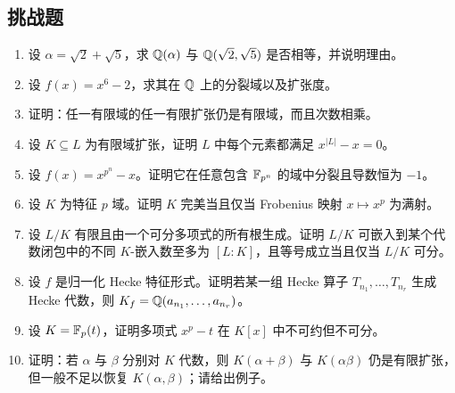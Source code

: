 \subsection*{挑战题}
\begin{enumerate}[resume, label=\textbf{\arabic*.}, leftmargin=*, itemsep=0.5em]
\item \hard 设 $\alpha=\sqrt2+\sqrt5$，求 $\mathbb{Q}(\alpha)$ 与 $\mathbb{Q}(\sqrt2,\sqrt5)$ 是否相等，并说明理由。
\item \hard 设 $f(x)=x^6-2$，求其在 $\mathbb{Q}$ 上的分裂域以及扩张度。
\item \hard 证明：任一有限域的任一有限扩张仍是有限域，而且次数相乘。
\item \hard 设 $K\subseteq L$ 为有限域扩张，证明 $L$ 中每个元素都满足 $x^{|L|}-x=0$。
\item \hard 设 $f(x)=x^{p^n}-x$。证明它在任意包含 $\mathbb{F}_{p^n}$ 的域中分裂且导数恒为 $-1$。
\item \hard 设 $K$ 为特征 $p$ 域。证明 $K$ 完美当且仅当 Frobenius 映射 $x\mapsto x^p$ 为满射。
\item \hard 设 $L/K$ 有限且由一个可分多项式的所有根生成。证明 $L/K$ 可嵌入到某个代数闭包中的不同 $K$-嵌入数至多为 $[L:K]$，且等号成立当且仅当 $L/K$ 可分。
\item \hard 设 $f$ 是归一化 Hecke 特征形式。证明若某一组 Hecke 算子 $T_{n_1},\dots,T_{n_r}$ 生成 Hecke 代数，则 $K_f=\mathbb{Q}(a_{n_1},\dots,a_{n_r})$。
\item \hard 设 $K=\mathbb{F}_p(t)$，证明多项式 $x^p-t$ 在 $K[x]$ 中不可约但不可分。
\item \hard 证明：若 $\alpha$ 与 $\beta$ 分别对 $K$ 代数，则 $K(\alpha+\beta)$ 与 $K(\alpha\beta)$ 仍是有限扩张，但一般不足以恢复 $K(\alpha,\beta)$；请给出例子。
\end{enumerate}


